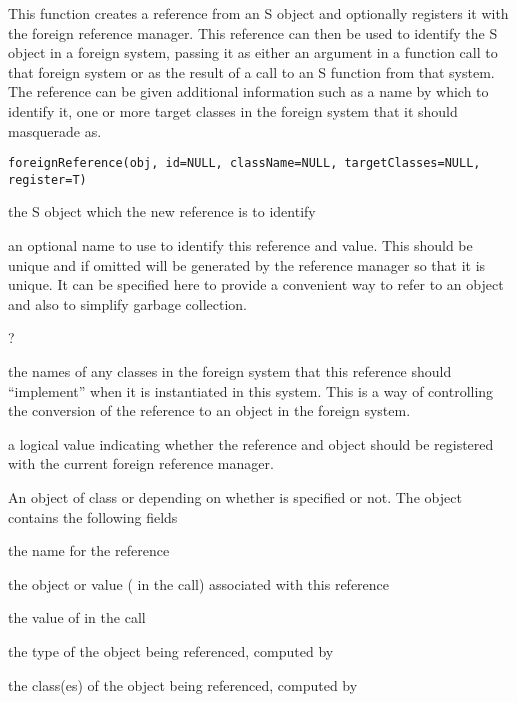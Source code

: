 \begin{Description}\relax
This function creates a reference from an S object and optionally
registers it with the foreign reference manager.  This reference can
then be used to identify the S object  in a foreign
system, passing it as either an argument in a function call
to that foreign system or as the result of a call to an
S function from that system.
The reference can be given additional information
such as a name by which to identify it, one or more
target classes in the foreign system that it should 
masquerade as.\end{Description}
\begin{Usage}
\begin{verbatim}
foreignReference(obj, id=NULL, className=NULL, targetClasses=NULL, register=T)
\end{verbatim}
\end{Usage}
\begin{Arguments}
\begin{ldescription}
\item[\code{obj}] the S object which the new reference is to identify
\item[\code{id}] an optional name to use to identify this reference and value.
This should be unique and if omitted will be generated by the reference manager
so that it is unique. It can be specified here to provide a convenient way to 
refer to an object and also to simplify garbage collection.
\item[\code{className}] ?
\item[\code{targetClasses}] the names of any classes in the foreign system 
that this reference should ``implement'' when it is instantiated in this system.
This is a way of controlling the conversion of the reference to an object
in the foreign system.
\item[\code{register}] a logical value indicating whether the reference
and object should be registered with the current foreign reference manager. 
\end{ldescription}
\end{Arguments}
\begin{Value}
An object of class 
 or
 depending on whether
 is specified or not.
The object contains the following fields
\begin{ldescription}
\item[\code{id}] the name for the reference
\item[\code{value}] the object or value ( in the call) associated with this reference
\item[\code{className}] 
\item[\code{targetClasses}] the value of  in the call
\item[\code{type}] the type of the object being referenced, computed by 
\item[\code{classes}] the class(es) of the object being referenced, computed by 
\end{ldescription}
\end{Value}
